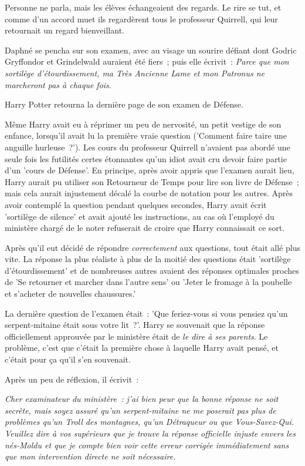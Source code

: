 Personne ne parla, mais les élèves échangeaient des regards. Le rire se tut, et comme d'un accord muet ils regardèrent tous le professeur Quirrell, qui leur retournait un regard bienveillant.

Daphné se pencha sur son examen, avec au visage un sourire défiant dont Godric Gryffondor et Grindelwald auraient été fiers~; puis elle écrivit~: \emph{Parce que mon sortilège d'étourdissement, ma Très Ancienne Lame et mon Patronus ne marcheront pas à chaque fois}.

\later

Harry Potter retourna la dernière page de son examen de Défense.

Même Harry avait eu à réprimer un peu de nervosité, un petit vestige de son enfance, lorsqu'il avait lu la première vraie question ('Comment faire taire une anguille hurleuse~?'). Les cours du professeur Quirrell n'avaient pas abordé une seule fois les futilités certes étonnantes qu'un idiot avait cru devoir faire partie d'un 'cours de Défense'. En principe, après avoir appris que l'examen aurait lieu, Harry aurait pu utiliser son Retourneur de Temps pour lire son livre de Défense~; mais cela aurait injustement décalé la courbe de notation pour les autres. Après avoir contemplé la question pendant quelques secondes, Harry avait écrit 'sortilège de silence' et avait ajouté les instructions, au cas où l'employé du ministère chargé de le noter refuserait de croire que Harry connaissait ce sort.

Après qu'il eut décidé de répondre \emph{correctement} aux questions, tout était allé plus vite. La réponse la plus réaliste à plus de la moitié des questions était 'sortilège d'étourdissement' et de nombreuses autres avaient des réponses optimales proches de 'Se retourner et marcher dans l'autre sens' ou 'Jeter le fromage à la poubelle et s'acheter de nouvelles chaussures.'

La dernière question de l'examen était~: 'Que feriez-vous si vous pensiez qu'un serpent-mitaine était sous votre lit~?'. Harry se souvenait que la réponse officiellement approuvée par le ministère était de \emph{le dire à ses parents}. Le problème, c'est que c'était la première chose à laquelle Harry avait pensé, et c'était pour ça qu'il s'en souvenait.

Après un peu de réflexion, il écrivit~:

\emph{Cher examinateur du ministère~: j'ai bien peur que la bonne réponse ne soit secrète, mais soyez assuré qu'un serpent-mitaine ne me poserait pas plus de problèmes qu'un Troll des montagnes, qu'un Détraqueur ou que Vous-Savez-Qui. Veuillez dire à vos supérieurs que je trouve la réponse officielle injuste envers les nés-Moldu et que je compte bien voir cette erreur corrigée immédiatement sans que mon intervention directe ne soit nécessaire.}

